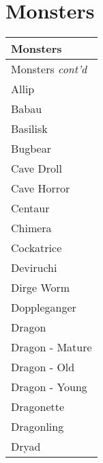 \documentclass[twoside]{book}
\begin{document}
\section{Monsters}
    
\begin{longtable}{p{1.25in}} 
  Monsters
  \\
  \hline
  \hline
  \endfirsthead
  Monsters \textit{cont'd}
        
  \\
  \endhead
      
  \raggedright
           Allip 
  \tabularnewline
  \hline
      
  \raggedright
           Babau 
  \tabularnewline
  \hline
      
  \raggedright
           Basilisk 
  \tabularnewline
  \hline
      
  \raggedright
           Bugbear 
  \tabularnewline
  \hline
      
  \raggedright
           Cave Droll 
  \tabularnewline
  \hline
      
  \raggedright
           Cave Horror 
  \tabularnewline
  \hline
      
  \raggedright
           Centaur 
  \tabularnewline
  \hline
      
  \raggedright
           Chimera 
  \tabularnewline
  \hline
      
  \raggedright
           Cockatrice 
  \tabularnewline
  \hline
      
  \raggedright
           Deviruchi 
  \tabularnewline
  \hline
      
  \raggedright
           Dirge Worm 
  \tabularnewline
  \hline
      
  \raggedright
           Doppleganger 
  \tabularnewline
  \hline
      
  \raggedright
           Dragon 
  \tabularnewline
  \hline
      
  \raggedright
           Dragon - Mature 
  \tabularnewline
  \hline
      
  \raggedright
           Dragon - Old 
  \tabularnewline
  \hline
      
  \raggedright
           Dragon - Young 
  \tabularnewline
  \hline
      
  \raggedright
           Dragonette 
  \tabularnewline
  \hline
      
  \raggedright
           Dragonling 
  \tabularnewline
  \hline
      
  \raggedright
           Dryad 
  \tabularnewline
  \hline
      

\end{longtable}
\end{document}
